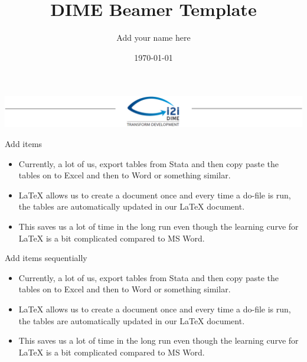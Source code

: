 \documentclass{beamer}
\title{DIME Beamer Template}
\author{Add your name here}
\institute{DIME - World Bank}
\date{\today}
\begin{document}
\begin{frame}
	\includegraphics[width=\textwidth]{img/Header.png}
	\vspace{-0.2cm}
	\titlepage 	 
\end{frame}



\begin{frame}{Add items}	

\begin{itemize}
	\item Currently, a lot of us, export tables from Stata and then copy paste the tables on to Excel and then to Word or something similar. 
	\item {\LaTeX} allows us to create a document once and every time a do-file is run, the tables are automatically updated in our {\LaTeX} document.
	\item This saves us a lot of time in the long run even though the learning curve for {\LaTeX} is a bit complicated compared to MS Word. 
	
\end{itemize}
\end{frame}

\begin{frame}{Add items sequentially}	

	\begin{itemize}
		\item<1->Currently, a lot of us, export tables from Stata and then copy paste the tables on to Excel and then to Word or something similar. 
		\item<2->{\LaTeX} allows us to create a document once and every time a do-file is run, the tables are automatically updated in our {\LaTeX} document.
		\item<3->This saves us a lot of time in the long run even though the learning curve for {\LaTeX} is a bit complicated compared to MS Word. 
		
	\end{itemize}
\end{frame}
\end{document}
